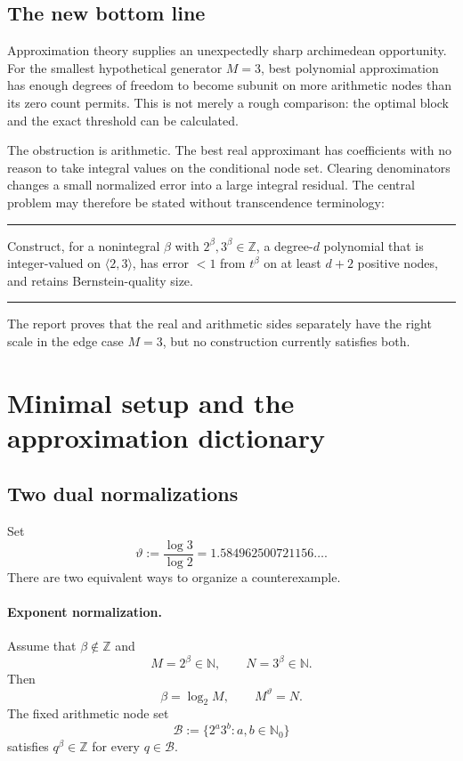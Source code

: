 \documentclass[11pt,oneside]{article}
\theoremstyle{definition}
\theoremstyle{remark}
\newcommand{\N}{\mathbb N}
\newcommand{\Nzero}{\mathbb N_0}
\newcommand{\Z}{\mathbb Z}
\newcommand{\Bsem}{\mathcal B}
\newcommand{\thetaq}{\vartheta}
\newenvironment{resultbox}
{\begin{center}\begin{minipage}{0.94\textwidth}\hrule\vspace{0.45em}}
{\vspace{0.35em}\hrule\end{minipage}\end{center}}
\begin{document}
\subsection{The new bottom line}

Approximation theory supplies an unexpectedly sharp archimedean opportunity.  For the
smallest hypothetical generator $M=3$, best polynomial approximation has enough degrees of
freedom to become subunit on more arithmetic nodes than its zero count permits.  This is not
merely a rough comparison: the optimal block and the exact threshold can be calculated.

The obstruction is arithmetic.  The best real approximant has coefficients with no reason to
take integral values on the conditional node set.  Clearing denominators changes a small
normalized error into a large integral residual.  The central problem may therefore be stated
without transcendence terminology:

\begin{resultbox}
Construct, for a nonintegral $\beta$ with $2^\beta,3^\beta\in\Z$, a degree-$d$ polynomial
that is integer-valued on $\langle2,3\rangle$, has error $<1$ from $t^\beta$ on at least
$d+2$ positive nodes, and retains Bernstein-quality size.
\end{resultbox}

The report proves that the real and arithmetic sides separately have the right scale in the
edge case $M=3$, but no construction currently satisfies both.

\section{Minimal setup and the approximation dictionary}
\label{sec:setup}

\subsection{Two dual normalizations}

Set
\[
  \thetaq:=\frac{\log3}{\log2}=1.584962500721156\ldots.
\]
There are two equivalent ways to organize a counterexample.

\paragraph{Exponent normalization.}
Assume that $\beta\notin\Z$ and
\[
  M=2^\beta\in\N,\qquad N=3^\beta\in\N.
\]
Then
\[
  \beta=\log_2M,\qquad M^{\thetaq}=N.
\]
The fixed arithmetic node set
\[
  \Bsem:=\{2^a3^b:a,b\in\Nzero\}
\]
satisfies $q^\beta\in\Z$ for every $q\in\Bsem$.
\end{document}
